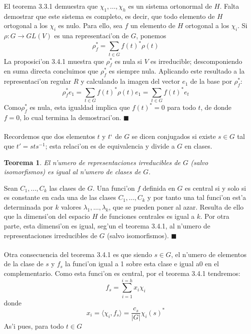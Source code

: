 \documentclass[a4paper,openright,12pt]{report}
\numberwithin{equation}{section} %
\newtheorem{teorema}{Teorema}[section] %
\newenvironment{proof}{\noindent{\it Demostracion:}}{\hfill$\blacksquare$} %
\begin{document}
\begin{proof}
El teorema 3.3.1 demuestra que $\chi_{1}, \ldots ,\chi_{h}$ es un sistema ortonormal de $H$. Falta demostrar que este sistema es completo, es decir, que todo elemento de $H$ ortogonal a los $\chi_{i}$ es nulo. Para ello, sea $f$ un elemento de $H$ ortogonal a los $\chi_{i}$. Si $\rho : G \rightarrow GL(V)$ es una representaci'on de $G$, ponemos
\[
\rho_{f}^{*}=\sum_{t \in G}f(t)^{*}\rho (t)
\]
La proposici'on 3.4.1 muestra que $\rho_{f}^{*}$ es nula si $V$ es irreducible; descomponiendo en suma directa concluimos que $\rho_{f}^{*}$ es siempre nula. Aplicando este resultado a la representaci'on regular $R$ y calculando la imagen del vector $e_{1}$ de la base por $\rho_{f}^{*}$:
\[
\rho_{f}^{*}e_{1}=\sum_{t \in G} f(t)^{*}\rho(t)e_{1}=\sum_{t \in G}f(t)^{*}e_{t}
\]
Como$\rho_{f}^{*}$ es nula, esta igualdad implica que $f(t)^{*}=0$ para todo $t$, de donde $f=0$, lo cual termina la demostraci'on.
\end{proof}\\
\\
Recordemos que dos elementos $t$ y $t`$ de $G$ se dicen conjugados si existe $s \in G$ tal que $t'=sts^{-1}$; esta relaci'on es de equivalencia y divide a $G$ en clases.
\begin{teorema}
El n'umero de representaciones irreducibles de $G$ (salvo isomorfismos) es igual al n'umero de clases de $G$.
\end{teorema}
\begin{proof}
Sean $C_{1}, \ldots ,C_{k}$ las clases de $G$. Una funci'on $f$ definida en $G$ es central si y solo si es constante en cada una de las clases $C_{1}, \ldots ,C_{k}$ y por tanto una tal funci'on est'a determinada por $k$ valores $\lambda_{1}, \ldots ,\lambda_{k}$, que se pueden poner al azar. Resulta de ello que la dimensi'on del espacio $H$ de funciones centrales es igual a $k$. Por otra parte, esta dimensi'on es igual, seg'un el teorema 3.4.1, al n'umero de representaciones irreducibles de $G$ (salvo isomorfismos).
\end{proof}\\
\\
Otra consecuencia del teorema 3.4.1 es que siendo $s\in G$, el n'umero de elementos de la clase de $s$ y $f_{s}$ la funci'on igual a 1 sobre esta clase e igual a0 en el complementario. Como esta funci'on es central, por el teorema 3.4.1 tendremos:
\[
f_{s}=\sum_{i=1}^{i=h}x_{i}\chi_{i}
\]
donde
\[
x_{i}=\langle \chi_{i} , f_{s} \rangle = \frac{c_{s}}{|G|}\chi_{i}(s)^{*}
\]
As'i pues, para todo $t \in G$
\end{document}
